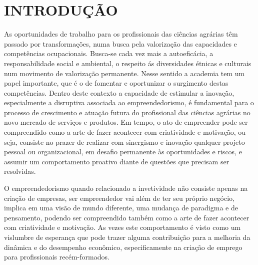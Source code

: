 \chapter{INTRODUÇÃO}

As oportunidades de trabalho para os profissionais das ciências agrárias têm passado por transformações, numa busca pela valorização das capacidades e competências ocupacionais. Busca-se cada vez mais a autoeficácia, a responsabilidade social e ambiental, o respeito ás diversidades étnicas e culturais num movimento de valorização permanente. Nesse sentido a academia tem um papel importante, que é o de fomentar e oportunizar o surgimento destas competências. Dentro deste contexto a capacidade de estimular a inovação, especialmente a disruptiva associada ao empreendedorismo, é fundamental para o processo de crescimento e atuação futura do profissional das ciências agrárias no novo mercado de serviços e produtos. Em tempo, o ato de empreender pode ser compreendido como a arte de fazer acontecer com criatividade e motivação, ou seja, consiste no prazer de realizar com sinergismo e inovação qualquer projeto pessoal ou organizacional, em desafio permanente às oportunidades e riscos, e assumir um comportamento proativo diante de questões que precisam ser resolvidas.

O empreendedorismo quando relacionado a invetividade não consiste apenas na criação de empresas, ser empreendedor vai além de ter seu próprio negócio, implica em uma visão de mundo diferente, uma mudança de paradigma e de pensamento, podendo ser compreendido também como a arte de fazer acontecer com criatividade e motivação. As vezes este comportamento é visto como um vislumbre de esperança que pode trazer alguma contribuição para a melhoria da dinâmica e do desempenho econômico, especificamente na criação de emprego para profissionais recém-formados. 


